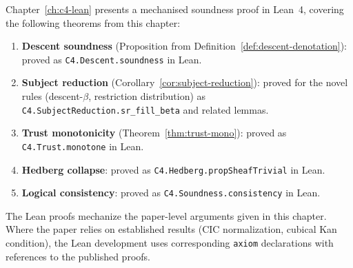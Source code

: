 Chapter~\ref{ch:c4-lean} presents a mechanised soundness proof in
Lean~4, covering the following theorems from this chapter:

\begin{enumerate}
\item \textbf{Descent soundness}
  (Proposition from Definition~\ref{def:descent-denotation}):
  proved as \texttt{C4.Descent.soundness} in Lean.
\item \textbf{Subject reduction} (Corollary~\ref{cor:subject-reduction}):
  proved for the novel rules (descent-\(\beta\), restriction
  distribution) as \texttt{C4.SubjectReduction.sr\_fill\_beta}
  and related lemmas.
\item \textbf{Trust monotonicity}
  (Theorem~\ref{thm:trust-mono}):
  proved as \texttt{C4.Trust.monotone} in Lean.
\item \textbf{Hedberg collapse}:
  proved as \texttt{C4.Hedberg.propSheafTrivial} in Lean.
\item \textbf{Logical consistency}:
  proved as \texttt{C4.Soundness.consistency} in Lean.
\end{enumerate}

The Lean proofs mechanize the paper-level arguments given in this
chapter.  Where the paper relies on established results (CIC
normalization, cubical Kan condition), the Lean development uses
corresponding \texttt{axiom} declarations with references to the
published proofs.
